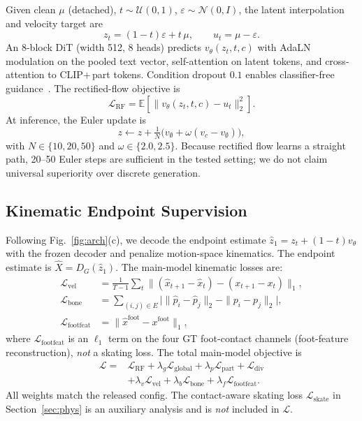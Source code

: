\documentclass[journal]{IEEEtran}
\begin{document}
Given clean $\mu$ (detached), $t\sim\mathcal{U}(0,1)$, $\varepsilon\sim\mathcal{N}(0,I)$, the latent interpolation and velocity target are
\begin{equation}
z_t=(1-t)\varepsilon+t\,\mu,\qquad u_t=\mu-\varepsilon.
\end{equation}
An 8-block DiT (width 512, 8 heads) predicts $v_\theta(z_t,t,c)$ with AdaLN modulation on the pooled text vector, self-attention on latent tokens, and cross-attention to CLIP$+\,$part tokens. Condition dropout $0.1$ enables classifier-free guidance~\cite{ho2022cfg}. The rectified-flow objective is
\begin{equation}
\mathcal{L}_{\mathrm{RF}}=\mathbb{E}\!\left[\|v_\theta(z_t,t,c)-u_t\|_2^2\right].
\end{equation}
At inference, the Euler update is
\begin{equation}
z\leftarrow z+\tfrac{1}{N}\bigl(v_\emptyset+\omega(v_c-v_\emptyset)\bigr),
\end{equation}
with $N\in\{10,20,50\}$ and $\omega\in\{2.0,2.5\}$. Because rectified flow learns a straight path, 20--50 Euler steps are sufficient in the tested setting; we do not claim universal superiority over discrete generation.

\subsection{Kinematic Endpoint Supervision}
\label{sec:method-kin}

Following Fig.~\ref{fig:arch}(c), we decode the endpoint estimate $\hat z_1=z_t+(1-t)v_\theta$ with the frozen decoder and penalize motion-space kinematics. The endpoint estimate is $\hat X=D_G(\hat z_1)$. The main-model kinematic losses are:
\begin{align}
\mathcal{L}_{\mathrm{vel}}&=\tfrac{1}{T-1}\sum_t\|(\hat x_{t+1}-\hat x_t)-(x_{t+1}-x_t)\|_1,\\
\mathcal{L}_{\mathrm{bone}}&=\sum_{(i,j)\in E}\bigl|\|\hat p_i-\hat p_j\|_2-\|p_i-p_j\|_2\bigr|,\\
\mathcal{L}_{\mathrm{footfeat}}&=\|\hat x^{\mathrm{foot}}-x^{\mathrm{foot}}\|_1,
\end{align}
where $\mathcal{L}_{\mathrm{footfeat}}$ is an $\ell_1$ term on the four GT foot-contact channels (foot-feature reconstruction), \emph{not} a skating loss. The total main-model objective is
\begin{equation}
\begin{aligned}
\mathcal{L}={}&\mathcal{L}_{\mathrm{RF}}+\lambda_g\mathcal{L}_{\mathrm{global}}+\lambda_p\mathcal{L}_{\mathrm{part}}+\mathcal{L}_{\mathrm{div}}\\
&+\lambda_v\mathcal{L}_{\mathrm{vel}}+\lambda_b\mathcal{L}_{\mathrm{bone}}+\lambda_f\mathcal{L}_{\mathrm{footfeat}}.
\end{aligned}
\end{equation}
All weights match the released config. The contact-aware skating loss $\mathcal{L}_{\mathrm{skate}}$ in Section~\ref{sec:phys} is an auxiliary analysis and is \emph{not} included in $\mathcal{L}$.
\end{document}
